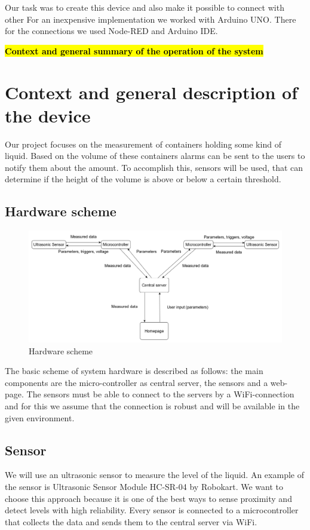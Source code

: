 \documentclass{article}
\begin{document}
Our task was to create this device and also make it possible to connect with other 
For an inexpensive implementation we worked with Arduino UNO. There for the connections we used Node-RED and Arduino IDE.

\textcolor{red}{\textbf{\hl{Context and general summary of the operation of the system}}}

\section{Context and general description of the device}

Our project focuses on the measurement of containers holding some kind of liquid. Based on the volume of these containers alarms can be sent to the users to notify them about the amount. To accomplish this, sensors will be used, that can determine if the height of the volume is above or below a certain threshold. \par

\subsection{Hardware scheme}

\begin{figure}[h]
\label{scheme}
\hspace{-1cm}
\includegraphics[scale=0.325]{images/circuit3.png}
\caption{Hardware scheme}
\end{figure}

The basic scheme of system hardware is described as follows: the main components
are the micro-controller as central server, the sensors and a web-page. The
sensors must be able to connect to the servers by a WiFi-connection and for this
we assume that the connection is robust and will be available in the given
environment. \par

\subsection{Sensor}
We will use an ultrasonic sensor to measure the level of the liquid. An example of the sensor is Ultrasonic Sensor Module HC-SR-04 by Robokart. 
We want to choose this approach because it is one of the best ways to sense proximity and detect levels with high reliability. Every sensor is connected to a microcontroller 
that collects the data and sends them to the central server via WiFi.  
\end{document}
